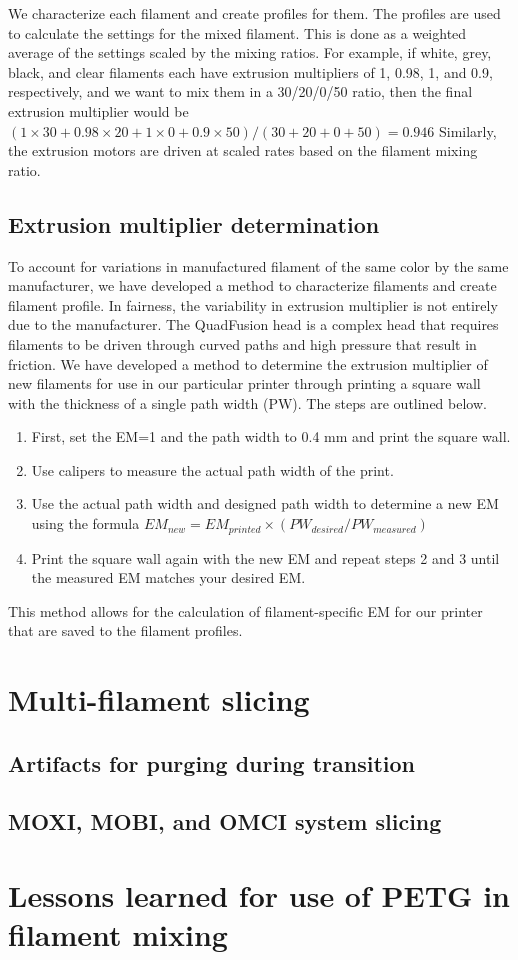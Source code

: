 We characterize each filament and create profiles for them. The profiles are used to calculate the settings for the mixed filament. This is done as a weighted average of the settings scaled by the mixing ratios. For example, if white, grey, black, and clear filaments each have extrusion multipliers of 1, 0.98, 1, and 0.9, respectively, and we want to mix them in a 30/20/0/50 ratio, then the final extrusion multiplier would be
$(1\times30 + 0.98\times20 + 1\times0 + 0.9\times50) / (30+20+0+50) = 0.946$ Similarly, the extrusion motors are driven at scaled rates based on the filament mixing ratio.

\subsection{Extrusion multiplier determination}
To account for variations in manufactured filament of the same color by the same manufacturer, we have developed a method to characterize filaments and create filament profile. In fairness, the variability in extrusion multiplier is not entirely due to the manufacturer. The QuadFusion head is a complex head that requires filaments to be driven through curved paths and high pressure that result in friction. We have developed a method to determine the extrusion multiplier of new filaments for use in our particular printer through printing a square wall with the thickness of a single path width (PW). The steps are outlined below. 
\begin{enumerate}
    \item First, set the EM=1 and the path width to 0.4 mm and print the square wall.
    \item Use calipers to measure the actual path width of the print.
    \item Use the actual path width and designed path width to determine a new EM using the formula $EM_{new} = EM_{printed} \times (PW_{desired}/PW_{measured})$
    \item Print the square wall again with the new EM and repeat steps 2 and 3 until the measured EM matches your desired EM. 
\end{enumerate}
 
This method allows for the calculation of filament-specific EM for our printer that are saved to the filament profiles. 



\section{Multi-filament slicing}

\subsection{Artifacts for purging during transition}

\subsection{MOXI, MOBI, and OMCI system slicing}



\section{Lessons learned for use of PETG in filament mixing}



